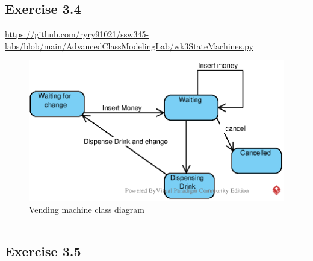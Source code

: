 \subsection{Exercise 3.4}
\url{https://github.com/ryry91021/ssw345-labs/blob/main/AdvancedClassModelingLab/wk3StateMachines.py}
\begin{figure}[H]
    \centering
    \includegraphics[width=\textwidth]{images/EPS/stateMachineVending.eps}
    \caption{Vending machine class diagram}
    \label{fig:Vending Machine}
\end{figure}

\noindent\rule{\textwidth}{0.4pt} %


\subsection{Exercise 3.5}

